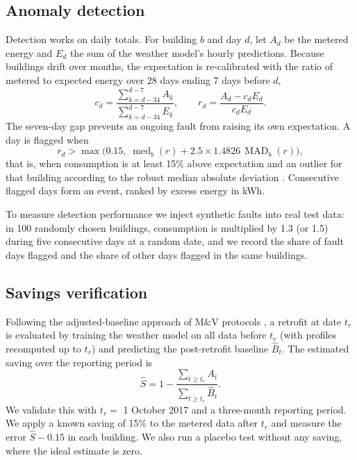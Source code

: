 \documentclass[11pt,a4paper]{article}
\begin{document}
\subsection{Anomaly detection}
Detection works on daily totals. For building $b$ and day $d$, let $A_d$ be the metered energy and $E_d$ the sum of
the weather model's hourly predictions. Because buildings drift over months, the expectation is re-calibrated with
the ratio of metered to expected energy over 28 days ending 7 days before $d$,
\begin{equation}
c_d = \frac{\sum_{k=d-34}^{d-7} A_k}{\sum_{k=d-34}^{d-7} E_k},\qquad
r_d = \frac{A_d - c_d E_d}{c_d E_d}.
\end{equation}
The seven-day gap prevents an ongoing fault from raising its own expectation. A day is flagged when
\begin{equation}
r_d > \max\!\Big(0.15,\; \operatorname{med}_b(r) + 2.5 \times 1.4826\,\operatorname{MAD}_b(r)\Big),
\end{equation}
that is, when consumption is at least 15\% above expectation and an outlier for that building according to the
robust median absolute deviation \citep{leys2013mad}. Consecutive flagged days form an event, ranked by excess
energy in kWh.

To measure detection performance we inject synthetic faults into real test data: in 100 randomly chosen buildings,
consumption is multiplied by 1.3 (or 1.5) during five consecutive days at a random date, and we record the share of
fault days flagged and the share of other days flagged in the same buildings.

\subsection{Savings verification}
Following the adjusted-baseline approach of M\&V protocols \citep{evo2022ipmvp,granderson2016accuracy}, a retrofit at
date $t_r$ is evaluated by training the weather model on all data before $t_r$ (with profiles recomputed up to
$t_r$) and predicting the post-retrofit baseline $\hat{B}_t$. The estimated saving over the reporting period is
\begin{equation}
\hat{S} = 1-\frac{\sum_{t\ge t_r} A_t}{\sum_{t\ge t_r}\hat{B}_t}.
\end{equation}
We validate this with $t_r =$ 1 October 2017 and a three-month reporting period. We apply a known saving of 15\% to
the metered data after $t_r$ and measure the error $\hat{S}-0.15$ in each building. We also run a placebo test
without any saving, where the ideal estimate is zero.
\end{document}
